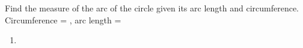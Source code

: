 Find the measure of the arc of the circle given its arc length and circumference.
\newline
Circumference = , arc length = 
\newline
\begin{enumerate}
    \item
\end{enumerate}
